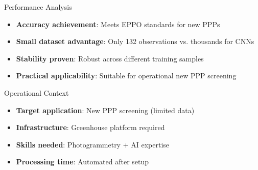 \documentclass[aspectratio=43]{beamer}
\begin{document}
\begin{frame}
\begin{columns}
        \begin{column}{0.5\textwidth}
            \begin{alertblock}{Performance Analysis}
                \scriptsize
                \begin{itemize}
                    \item \textbf{Accuracy achievement}: Meets EPPO standards for new PPPs
                    \item \textbf{Small dataset advantage}: Only 132 observations vs. thousands for CNNs
                    \item \textbf{Stability proven}: Robust across different training samples
                    \item \textbf{Practical applicability}: Suitable for operational new PPP screening
                \end{itemize}
            \end{alertblock}
            
            \begin{block}{Operational Context}
                \scriptsize
                \begin{itemize}
                    \item \textbf{Target application}: New PPP screening (limited data)
                    \item \textbf{Infrastructure}: Greenhouse platform required
                    \item \textbf{Skills needed}: Photogrammetry + AI expertise
                    \item \textbf{Processing time}: Automated after setup
                \end{itemize}
            \end{block}
        \end{column}
    \end{columns}
\end{frame}
\end{document}
